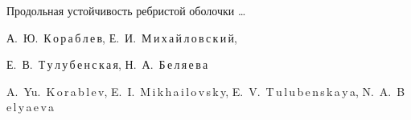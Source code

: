 %










\filllastpage %









%

%

%








{Продольная устойчивость ребристой оболочки \dots}




{А.~Ю.~К\,о\,р\,а\,б\,л\,е\,в, Е.~И.~М\,и\,х\,а\,й\,л\,о\,в\,с\,к\,и\,й, 

Е.~В.~Т\,у\,л\,у\,б\,е\,н\,с\,к\,а\,я, Н.~А.~Б\,е\-\,л\,я\,е\,в\,а}






{A.~Yu.~K\,o\,r\,a\,b\,l\,e\,v, E.~I.~M\,i\,k\,h\,a\,i\,l\,o\,v\,s\,k\,y, E.~V.~T\,u\,l\,u\,b\,e\,n\,s\,k\,a\,y\,a, N.~A.~B\,e\,\-l\,y\,a\,e\,\-v\,a}







